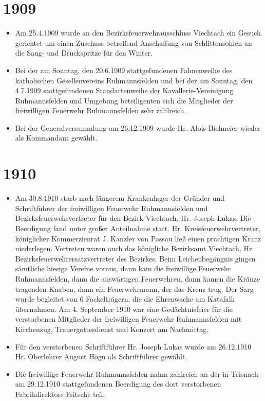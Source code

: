 \documentclass[12pt,a4paper]{book}
\begin{document}
\section*{1909}

\begin{itemize}
\item Am 25.4.1909 wurde an den Bezirksfeuerwehrausschluss Viechtach ein
Gesuch gerichtet um einen Zuschuss betreffend Anschaffung von
Schlittensohlen an die Saug- und Druckspritze für den Winter.

\item Bei der am Sonntag, den 20.6.1909 stattgefundenen Fahnenweihe des
katholischen Gesellenvereins Ruhmannsfelden und bei der am Sonntag, den
4.7.1909 stattgefundenen Standartenweihe der Kavallerie-Vereinigung
Ruhmannsfelden und Umgebung beteiligenten sich die Mitglieder der
freiwilligen Feuerwehr Ruhmannsfelden sehr zahlreich.

\item Bei der Generalversammlung am 26.12.1909 wurde Hr. Alois Bielmeier
wieder als Kommandant gewählt.
\end{itemize}

\section*{1910}

\begin{itemize}
\item Am 30.8.1910 starb nach längerem Krankenlager der Gründer und
Schriftführer der freiwilligen Feuerwehr Ruhmannsfelden und
Bezirksfeuerwehrvertreter für den Bezirk Viechtach, Hr. Joseph Lukas.
Die Beerdigung fand unter großer Anteilnahme statt. Hr.
Kreisfeuerwehrvertreter, königlicher Kommerzienrat J. Kanzler von Passau
ließ einen prächtigen Kranz niederlegen. Vertreten waren auch das
königliche Bezirksamt Viechtach, Hr. Bezirksfeuerwehrersatzvertreter des
Bezirkes. Beim Leichenbegängnis gingen sämtliche hiesige Vereine voraus,
dann kam die freiwillige Feuerwehr Ruhmannsfelden, dann die auswärtigen
Feuerwehren, dann kamen die Kränze tragenden Knaben, dann ein
Feuerwehrmann, der das Kreuz trug. Der Sarg wurde begleitet von 6
Fackelträgern, die die Ehrenwache am Katafalk übernahmen. Am 4.
September 1910 war eine Gedächtnisfeier für die verstorbenen Mitglieder
der freiwilligen Feuerwehr Ruhmannsfelden mit Kirchenzug,
Trauergottesdienst und Konzert am Nachmittag.

\item Für den verstorbenen Schriftführer Hr. Joseph Lukas wurde am
26.12.1910 Hr. Oberlehrer August Högn als Schriftführer gewählt.

\item Die freiwillige Feuerwehr Ruhmannsfelden nahm zahlreich an der in
Teisnach am 29.12.1910 stattgefundenen Beerdigung des dort verstorbenen
Fabrikdirektors Fritsche teil.
\end{itemize}
\end{document}
